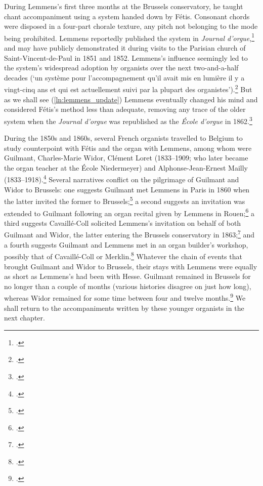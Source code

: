 During Lemmens's first three months at the Brussels conservatory, he taught chant accompaniment using a system handed down by Fétis.
Consonant chords were disposed in a four-part chorale texture, any pitch not belonging to the mode being prohibited.
Lemmens reportedly published the system in \covid{}\emph{Journal d'orgue},\footcite[3]{Lemmenschantgregoriensa1886} and may have publicly demonstrated it during visits to the Parisian church of Saint-Vincent-de-Paul in 1851 and 1852.
Lemmens's influence seemingly led to the system's widespread adoption by organists over the next two-and-a-half decades (`un système pour l'accompagnement qu'il avait mis en lumière il y a vingt-cinq ans et qui est actuellement suivi par la plupart des organistes').\footcite[57]{Bourgault-Ducoudraynouveausystemepour1878}
But as we shall see (\cref{ln:lemmens_update}) Lemmens eventually changed his mind and considered Fétis's method less than adequate, removing any trace of the older system when the \emph{Journal d'orgue} was republished as the \emph{École d'orgue} in 1862.\footcite[4]{Lemmenschantgregoriensa1886}

During the 1850s and 1860s, several French organists travelled to Belgium to study counterpoint with Fétis and the organ with Lemmens, among whom were Guilmant, Charles-Marie Widor, Clément Loret (1833--1909; who later became the organ teacher at the École Niedermeyer) and Alphonse-Jean-Ernest Mailly (1833--1918).\footcite[51--2]{OchseOrganistsOrganPlaying2000}
Several narratives conflict on the pilgrimage of Guilmant and Widor to Brussels: one suggests Guilmant met Lemmens in Paris in 1860 when the latter invited the former to Brussels;\footcite[2]{AlexandreGuilmant18371911} a second suggests an invitation was extended to Guilmant following an organ recital given by Lemmens in Rouen;\footcite[p.~viii]{LeupoldOrganMusicAlexandre1999} a third suggests Cavaillé-Coll solicited Lemmens's invitation on behalf of both Guilmant and Widor, the latter entering the Brussels conservatory in 1863;\footcite[77]{DouglassCavailleCollmusiciansdocumented1980} and a fourth suggests Guilmant and Lemmens met in an organ builder's workshop, possibly that of Cavaillé-Coll or Merklin.\footcite[56--7]{LuedersAlexandreGuilmant18372002}
Whatever the chain of events that brought Guilmant and Widor to Brussels, their stays with Lemmens were equally as short as Lemmens's had been with Hesse.
Guilmant remained in Brussels for no longer than a couple of months (various histories disagree on just how long), whereas Widor remained for some time between four and twelve months.\footcites[3]{AlexandreGuilmant18371911}[179, 260 n.~9]{OchseOrganistsOrganPlaying2000}
We shall return to the accompaniments written by these younger organists in the next chapter.

